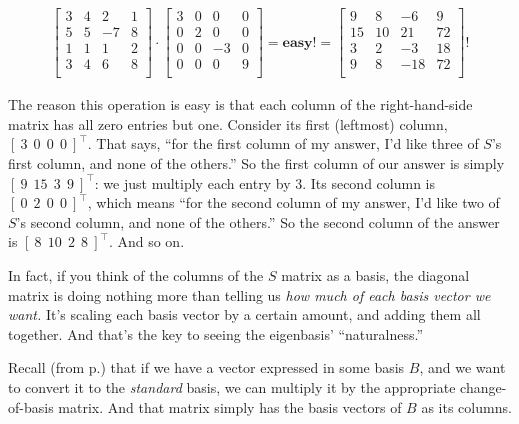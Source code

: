 \vspace{-.25in}
\begin{align*}
\begin{bmatrix}
3 & 4 & 2 & 1 \\
5 & 5 & -7 & 8 \\
1 & 1 & 1 & 2 \\
3 & 4 & 6 & 8 \\
\end{bmatrix} \cdot
\begin{bmatrix}
3 & 0 & 0 & 0 \\
0 & 2 & 0 & 0 \\
0 & 0 & -3 & 0 \\
0 & 0 & 0 & 9 \\
\end{bmatrix} = \textbf{easy!} =
\begin{bmatrix}
9 & 8 & -6 & 9 \\
15 & 10 & 21 & 72 \\
3 & 2 & -3 & 18 \\
9 & 8 & -18 & 72 \\
\end{bmatrix}\textrm{!}
\end{align*}
\vspace{-.15in}

The reason this operation is easy is that each column of the right-hand-side
matrix has all zero entries but one. Consider its first (leftmost) column, $[\
3\ \ 0\ \ 0\ \ 0\ ]^\intercal$. That says, ``for the first column of my answer,
I'd like three of $S$'s first column, and none of the others.'' So the first
column of our answer is simply $[\ 9\ \ 15\ \ 3\ \ 9\ ]^\intercal$: we just
multiply each entry by 3. Its second column is $[\ 0\ \ 2\ \ 0\ \ 0\
]^\intercal$, which means ``for the second column of my answer, I'd like two of
$S$'s second column, and none of the others.'' So the second column of the
answer is $[\ 8\ \ 10\ \ 2\ \ 8\ ]^\intercal$. And so on.

In fact, if you think of the columns of the $S$ matrix as a basis, the diagonal
matrix is doing nothing more than telling us \textit{how much of each basis
vector we want.} It's scaling each basis vector by a certain amount, and adding
them all together. And that's the key to seeing the eigenbasis'
``naturalness.''


Recall (from p.\pageref{changeOfBasisMatrix}) that if we have a vector
expressed in some basis $B$, and we want to convert it to the \textit{standard}
basis, we can multiply it by the appropriate change-of-basis matrix. And that
matrix simply has the basis vectors of $B$ as its columns.


